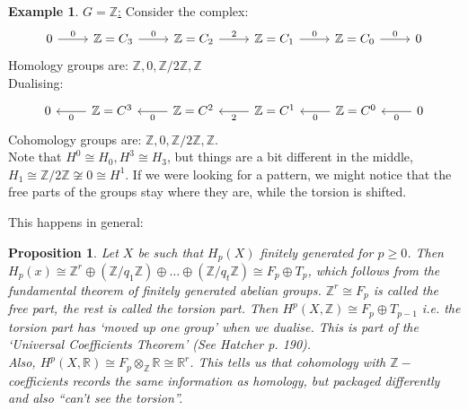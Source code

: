 \documentclass[10pt]{article}
\theoremstyle{plain}
\newtheorem{prop}[thm]{Proposition}
\theoremstyle{definition}
\newtheorem{exmp}[thm]{Example} %
\newcommand{\Real}{\mathbb{R}}
\newcommand{\Zint}{\mathbb{Z}}
\begin{document}
\begin{exmp}
    \underline{$G=\Zint$:} Consider the complex:
    $$%
    \begin{tikzcd}
    0 \arrow[r, "0"] & \mathbb{Z} = C_3 \arrow[r, "0"] & \mathbb{Z} = C_2 \arrow[r, " 2"] & \mathbb{Z} = C_1 \arrow[r, "0"] & \mathbb{Z} = C_0 \arrow[r, "0"] & 0
    \end{tikzcd}$$
    Homology groups are: $\Zint, 0, \Zint / 2\Zint, \Zint$\\
    Dualising: $$    \begin{tikzcd}
    0  & \arrow[l, "0"] \mathbb{Z} = C^3  & \arrow[l, "0"] \mathbb{Z} = C^2  &\arrow[l, " 2"] \mathbb{Z} = C^1 & \arrow[l, "0"] \mathbb{Z} = C^0  &\arrow[l, "0"] 0
    \end{tikzcd}$$
    Cohomology groups are: $\Zint, 0, \Zint/2\Zint, \Zint. $\\
    Note that $H^0 \cong H_0, H^3 \cong H_3$, but things are a bit different in the middle, $H_1 \cong \Zint / 2 \Zint \not \cong 0 \cong H^1 $. If we were looking for a pattern, we might notice that the free parts of the groups stay where they are, while the torsion is shifted.
\end{exmp}
This happens in general:

\begin{prop}
    Let $X$ be such that $H_p(X)$ finitely generated for $p \geq 0$. Then $H_p(x) \cong \Zint^r \oplus (\Zint / q_1 \Zint) \oplus \ldots \oplus (\Zint / q_t \Zint) \cong F_p \oplus T_p$, which follows from the fundamental theorem of finitely generated abelian groups. $\Zint^r \cong F_p$ is called the free part, the rest is called the torsion part. Then $H^p(X,\Zint) \cong F_p \oplus T_{p-1}$ i.e. the torsion part has `moved up one group' when we dualise. This is part of the `Universal Coefficients Theorem' (See Hatcher p. 190). \\
    Also, $H^p(X, \Real) \cong F_p \otimes_{\Zint} \Real \cong \Real^r$. This tells us that cohomology with $\Zint-$coefficients records the same information as homology, but packaged differently and also ``can't see the torsion''.
\end{prop}
\end{document}
